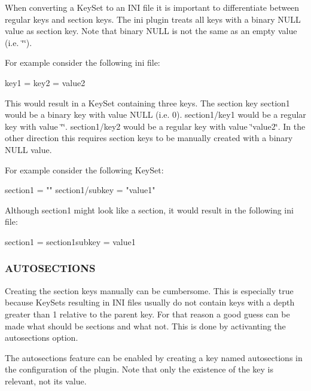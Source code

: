 When converting a Key\+Set to an I\+N\+I file it is important to differentiate between regular keys and section keys. The ini plugin treats all keys with a binary N\+U\+L\+L value as section key. Note that binary N\+U\+L\+L is not the same as an empty value (i.\+e. \char`\"{}\char`\"{}).

For example consider the following ini file\+: \begin{DoxyVerb}                            [section1]
                            key1 =
                            key2 = value2
\end{DoxyVerb}


This would result in a Key\+Set containing three keys. The section key {\ttfamily section1} would be a binary key with value N\+U\+L\+L (i.\+e. 0). {\ttfamily section1/key1} would be a regular key with value \char`\"{}\char`\"{}. {\ttfamily section1/key2} would be a regular key with value \char`\"{}value2\char`\"{}. In the other direction this requires section keys to be manually created with a binary N\+U\+L\+L value.

For example consider the following Key\+Set\+: \begin{DoxyVerb}                            section1 = ""
                            section1/subkey = "value1"
\end{DoxyVerb}


Although section1 might look like a section, it would result in the following ini file\+: \begin{DoxyVerb}                            section1 =
                            section1\/subkey = value1
\end{DoxyVerb}


\subsubsection*{A\+U\+T\+O\+S\+E\+C\+T\+I\+O\+N\+S}

Creating the section keys manually can be cumbersome. This is especially true because Key\+Sets resulting in I\+N\+I files usually do not contain keys with a depth greater than 1 relative to the parent key. For that reason a good guess can be made what should be sections and what not. This is done by activanting the autosections option.

The autosections feature can be enabled by creating a key named {\ttfamily autosections} in the configuration of the plugin. Note that only the existence of the key is relevant, not its value.

